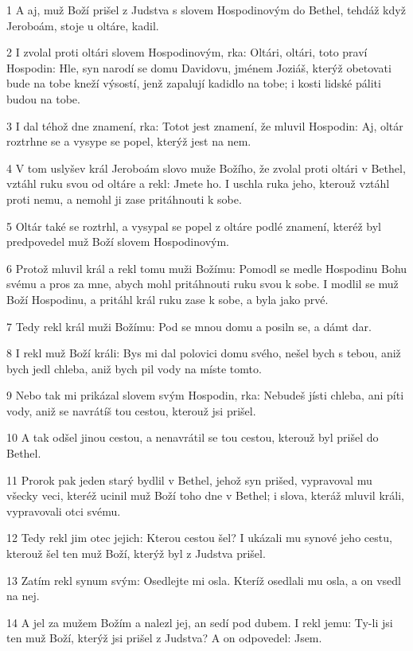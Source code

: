 \par 1 A aj, muž Boží prišel z Judstva s slovem Hospodinovým do Bethel, tehdáž když Jeroboám, stoje u oltáre, kadil.
\par 2 I zvolal proti oltári slovem Hospodinovým, rka: Oltári, oltári, toto praví Hospodin: Hle, syn narodí se domu Davidovu, jménem Joziáš, kterýž obetovati bude na tobe kneží výsostí, jenž zapalují kadidlo na tobe; i kosti lidské páliti budou na tobe.
\par 3 I dal téhož dne znamení, rka: Totot jest znamení, že mluvil Hospodin: Aj, oltár roztrhne se a vysype se popel, kterýž jest na nem.
\par 4 V tom uslyšev král Jeroboám slovo muže Božího, že zvolal proti oltári v Bethel, vztáhl ruku svou od oltáre a rekl: Jmete ho. I uschla ruka jeho, kterouž vztáhl proti nemu, a nemohl ji zase pritáhnouti k sobe.
\par 5 Oltár také se roztrhl, a vysypal se popel z oltáre podlé znamení, kteréž byl predpovedel muž Boží slovem Hospodinovým.
\par 6 Protož mluvil král a rekl tomu muži Božímu: Pomodl se medle Hospodinu Bohu svému a pros za mne, abych mohl pritáhnouti ruku svou k sobe. I modlil se muž Boží Hospodinu, a pritáhl král ruku zase k sobe, a byla jako prvé.
\par 7 Tedy rekl král muži Božímu: Pod se mnou domu a posiln se, a dámt dar.
\par 8 I rekl muž Boží králi: Bys mi dal polovici domu svého, nešel bych s tebou, aniž bych jedl chleba, aniž bych pil vody na míste tomto.
\par 9 Nebo tak mi prikázal slovem svým Hospodin, rka: Nebudeš jísti chleba, ani píti vody, aniž se navrátíš tou cestou, kterouž jsi prišel.
\par 10 A tak odšel jinou cestou, a nenavrátil se tou cestou, kterouž byl prišel do Bethel.
\par 11 Prorok pak jeden starý bydlil v Bethel, jehož syn prišed, vypravoval mu všecky veci, kteréž ucinil muž Boží toho dne v Bethel; i slova, kteráž mluvil králi, vypravovali otci svému.
\par 12 Tedy rekl jim otec jejich: Kterou cestou šel? I ukázali mu synové jeho cestu, kterouž šel ten muž Boží, kterýž byl z Judstva prišel.
\par 13 Zatím rekl synum svým: Osedlejte mi osla. Kteríž osedlali mu osla, a on vsedl na nej.
\par 14 A jel za mužem Božím a nalezl jej, an sedí pod dubem. I rekl jemu: Ty-li jsi ten muž Boží, kterýž jsi prišel z Judstva? A on odpovedel: Jsem.
